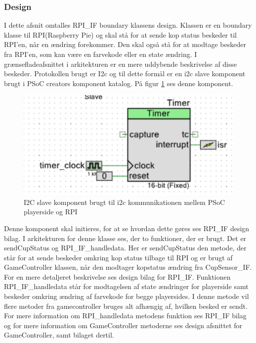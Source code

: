 \documentclass[Rapport/Playerside/RPI_IF/RPI_IF.tex]{subfiles}
\begin{document}
\subsubsection{Design}
I dette afsnit omtalles RPI\_IF boundary klassens design. Klassen er en boundary klasse til RPI(Raspberry Pie) og skal stå for at sende kop status beskeder til RPI'en, når en ændring forekommer. Den skal også stå for at modtage beskeder fra RPI'en, som kan være en farvekode eller en state ændring. I grænsefladeafsnittet i arkitekturen er en mere uddybende beskrivelse af disse beskeder. Protokollen brugt er I2c og til dette formål er en i2c slave komponent brugt i PSoC creators komponent katalog. På figur \ref{fig:I2c_slave} ses denne komponent.
\begin{figure}
    \centering 
    \includegraphics[width=\linewidth]{Softwaredesign/GameController/graphic/gamecontroller_timer.PNG}
    \caption{I2C slave komponent brugt til i2c kommunikationen mellem PSoC playerside og RPI}
    \label{fig:I2c_slave}
\end{figure}
Denne komponent skal initieres, for at se hvordan dette gøres ses RPI\_IF design bilag. I arkitekturen for denne klasse ses, der to funktioner, der er brugt. Det er sendCupStatus og RPI\_IF\_handledata. Her er sendCupStatus den metode, der står for at sende beskeder omkring kop status tilbage til RPI og er brugt af GameController klassen, når den modtager kopstatus ændring fra CupSensor\_IF. For en mere detaljeret beskrivelse ses design bilag for RPI\_IF. Funktionen  RPI\_IF\_handledata står for modtagelsen af state ændringer for playerside samt beskeder omkring ændring af farvekode for begge playersides. I denne metode vil flere metoder fra gamecontroller bruges alt afhængig af, hvilken besked er sendt. For mere information om RPI\_handledata metodens funktion ses RPI\_IF bilag og for mere information om GameController metoderne ses design afsnittet for GameController, samt bilaget dertil.
\end{document}
